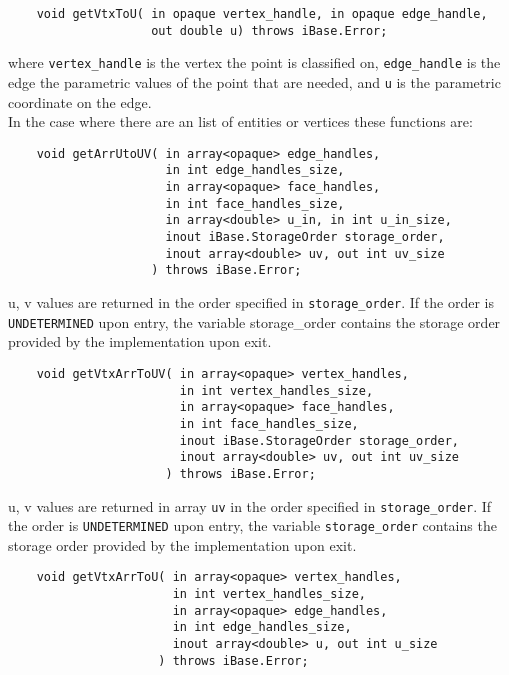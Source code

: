 \documentclass{article}
\begin{document}
\begin{verbatim}
    void getVtxToU( in opaque vertex_handle, in opaque edge_handle, 
                    out double u) throws iBase.Error;
\end{verbatim}
where {\tt vertex\_handle} is the vertex the point is classified 
on, {\tt edge\_handle} is the edge the parametric values of 
the point that are needed, and {\tt u} is the parametric coordinate 
on the edge.\\

\hspace{-16pt}In the case where there are an list of entities or vertices 
these functions are:

\begin{verbatim}
    void getArrUtoUV( in array<opaque> edge_handles, 
                      in int edge_handles_size,
                      in array<opaque> face_handles, 
                      in int face_handles_size,
                      in array<double> u_in, in int u_in_size,
                      inout iBase.StorageOrder storage_order,
                      inout array<double> uv, out int uv_size
                    ) throws iBase.Error;
\end{verbatim}
u, v values are returned in the order specified in {\tt storage\_order}. If the
order is {\tt UNDETERMINED} upon entry, the variable
{storage\_order} contains the storage order provided by the implementation upon
exit.

\begin{verbatim}
    void getVtxArrToUV( in array<opaque> vertex_handles, 
                        in int vertex_handles_size,
                        in array<opaque> face_handles, 
                        in int face_handles_size,
                        inout iBase.StorageOrder storage_order,
                        inout array<double> uv, out int uv_size
                      ) throws iBase.Error;
\end{verbatim}
u, v values are returned in array {\tt uv} in the order specified in
{\tt storage\_order}. If the order is {\tt UNDETERMINED} upon entry, the variable
{\tt storage\_order} contains the storage order provided by the implementation upon
exit.

\begin{verbatim}
    void getVtxArrToU( in array<opaque> vertex_handles, 
                       in int vertex_handles_size,
                       in array<opaque> edge_handles, 
                       in int edge_handles_size,
                       inout array<double> u, out int u_size
                     ) throws iBase.Error;
\end{verbatim}
\end{document}

